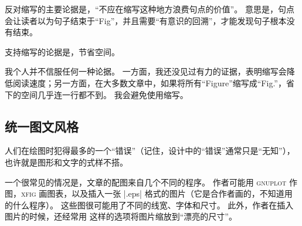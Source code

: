 \begin{itemize}
  反对缩写的主要论据是，“不应在缩写这种地方浪费句点的价值”。
  意思是，句点会让读者以为句子结束于“Fig”，并且需要“有意识的回溯”，才能发现句子根本没有结束。

  支持缩写的论据是，节省空间。

  我个人并不信服任何一种论据。
  一方面，我还没见过有力的证据，表明缩写会降低阅读速度；另一方面，在大多数文章中，如果将所有“Figure”缩写成“Fig.”，省下的空间几乎连一行都不到。
  我会避免使用缩写。
\end{itemize}


\subsection{统一图文风格}

\bohs

人们在绘图时犯得最多的一个“错误”（记住，设计中的“错误”通常只是“无知”），也许就是图形和文字的式样不搭。

一个很常见的情况是，文章的配图来自几个不同的程序。
作者可能用 \textsc{gnuplot} 作图，\textsc{xfig} 画图表，以及插入一张 |.eps| 格式的图片（它是合作者画的，不知道用的什么程序）。
这些图很可能用了不同的线宽、字体和尺寸。
此外，作者在插入图片的时候，还经常用 \ltz{[height=5cm]} 这样的选项将图片缩放到“漂亮的尺寸”。

